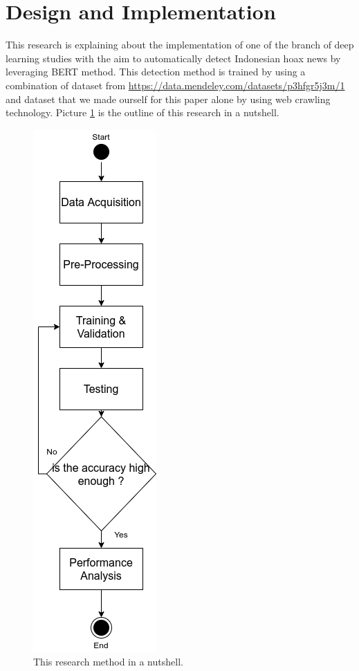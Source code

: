 \section{Design and Implementation}
\label{sec:designandimplementation}

This research is explaining about the implementation of one of the branch of deep learning studies with the aim to automatically detect Indonesian hoax news by leveraging BERT method. This detection method is trained by using a combination of dataset from \url{https://data.mendeley.com/datasets/p3hfgr5j3m/1} and dataset that we made ourself for this paper alone by using web crawling technology. Picture \ref{fig:metodologi} is the outline of this research in a nutshell.

\begin{figure} [h!]
    \centering
    \includegraphics[width=0.3\columnwidth]{gambar/Metodologi_Vertical_en.png}
    \caption{This research method in a nutshell.}
    \label{fig:metodologi}
\end{figure}

